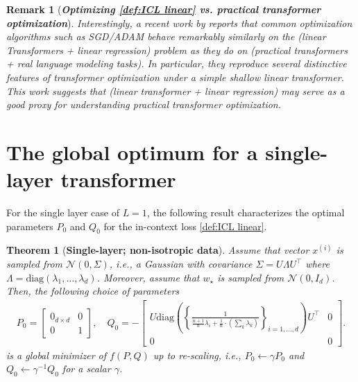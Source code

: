 \documentclass{article}
\newtheorem{theorem}{Theorem}
\newtheorem{remark}{Remark}
\newcommand{\wstar}{w_\star}
\newcommand{\tx}[1]{x^{(#1)}}
\newcommand{\emphh}[1]{\textbf{\emph{#1}}}
\begin{document}
\begin{remark}[\emphh{Optimizing \eqref{def:ICL linear} vs. practical transformer optimization}]
Interestingly, a recent work by \cite{ahn2023linear} reports that common optimization algorithms such as SGD/ADAM behave remarkably similarly on the (linear Transformers + linear regression) problem as they do on (practical transformers + real language modeling tasks).
In particular, they reproduce several distinctive features of transformer optimization under a simple shallow linear transformer. This work suggests that (linear transformer + linear regression) may serve as a good proxy for understanding practical transformer optimization. 
\end{remark}

 

\section{The global optimum for a single-layer transformer}
\label{sec:single}
For the single layer case of $L=1$, the following result characterizes the optimal parameters $P_0$ and $Q_0$ for the in-context loss \eqref{def:ICL linear}.  

\begin{theorem}
[\textbf{Single-layer; non-isotropic data}] \label{thm:main_single}
Assume that vector $\tx{i}$ is sampled from $\mathcal{N}(0, \Sigma)$, i.e., a Gaussian with covariance $\Sigma = U\Lambda U^\top$ where $\Lambda = \mathrm{diag}(\lambda_1,\dots, \lambda_d)$. 
Moreover, assume that  $\wstar$ is sampled  from $\mathcal{N}(0, I_d)$.  
Then, the following choice of parameters
\begin{align} \label{eq:single_layer}
P_0 = \begin{bmatrix}
0_{d\times d} & 0 \\ 
0 & 1 
\end{bmatrix} ,\quad Q_0 =  - \begin{bmatrix}
U \mathrm{diag}\left(\left\{\frac{1}{  \frac{n+1}{n}  \lambda_i +   \frac{1}{n} \cdot \left( \sum_k \lambda_k  \right)   } \right\}_{i=1,\dots,d}\right) U^\top & 0\\
0  & 0
\end{bmatrix} .
\end{align} 
is a  global minimizer of $f(P,Q)$ up to re-scaling, i.e., $P_0 \leftarrow \gamma P_0$ and $Q_0 \leftarrow \gamma^{-1} Q_0$ for a scalar $\gamma$.
\end{theorem}  
\end{document}
